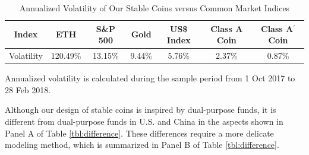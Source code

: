 \documentclass[final,pdftex]{ectaart}
\newcommand{\Ap}{A\ensuremath{^\prime}\xspace}
\theoremstyle{plain}
\begin{document}
\begin{table}[htb]
	\footnotesize
	\centering
	\caption{Annualized Volatility of Our Stable Coins versus Common Market Indices}\label{tbl:volcomp}
	\begin{tabular}{@{}c c c c c c c}
	\toprule
	Index & ETH & S\&P 500 & Gold &  US\$ Index & Class A Coin & Class \Ap Coin \\\midrule
	Volatility & 120.49\% & 13.15\% & 9.44\%  & 5.76\% & 2.37\% & 0.87\%\\
	\bottomrule
	\end{tabular}
	\vspace{0.5em}
	\par\flushleft\footnotesize Annualized volatility is calculated during the sample period from 1 Oct 2017 to 28 Feb 2018.
\end{table}


Although our design of stable coins is inspired by dual-purpose funds, it is different from dual-purpose funds in U.S. and China in the aspects shown in Panel A of Table \ref{tbl:difference}. These differences require a more delicate modeling method, which is summarized in Panel B of Table \ref{tbl:difference}.
\end{document}
